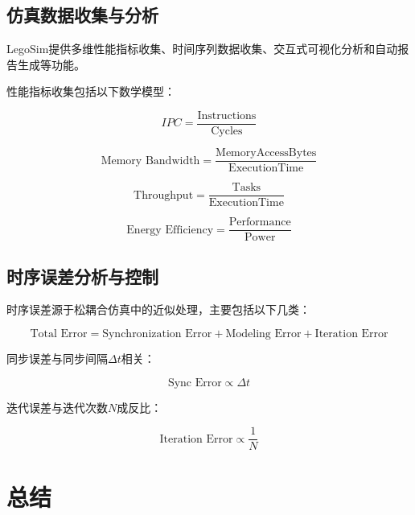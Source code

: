 \documentclass[bachelor]{thesis-uestc}
\begin{document}
\subsection{仿真数据收集与分析}

LegoSim提供多维性能指标收集、时间序列数据收集、交互式可视化分析和自动报告生成等功能。

性能指标收集包括以下数学模型：

\begin{equation}
IPC = \frac{\text{Instructions}}{\text{Cycles}}
\end{equation}

\begin{equation}
\text{Memory Bandwidth} = \frac{\text{MemoryAccessBytes}}{\text{ExecutionTime}}
\end{equation}

\begin{equation}
\text{Throughput} = \frac{\text{Tasks}}{\text{ExecutionTime}}
\end{equation}

\begin{equation}
\text{Energy Efficiency} = \frac{\text{Performance}}{\text{Power}}
\end{equation}

\subsection{时序误差分析与控制}

时序误差源于松耦合仿真中的近似处理，主要包括以下几类：

\begin{equation}
\text{Total Error} = \text{Synchronization Error} + \text{Modeling Error} + \text{Iteration Error}
\end{equation}

同步误差与同步间隔$\Delta t$相关：

\begin{equation}
\text{Sync Error} \propto \Delta t
\end{equation}

迭代误差与迭代次数$N$成反比：

\begin{equation}
\text{Iteration Error} \propto \frac{1}{N}
\end{equation}


\section{总结}
\end{document}

